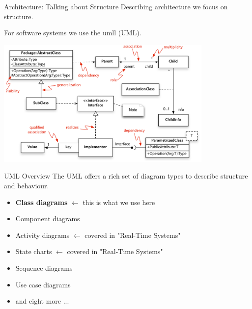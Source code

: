 \begin{frame}{Architecture: Talking about Structure}
   Describing architecture we focus on \gls{structure}.

   For software systems we use the \gls{umll} (\gls{UML}).

\begin{center}
  \includegraphics[height=180pt]{umlclasscheat.png}
\end{center}
  
\end{frame}

\begin{frame}{UML Overview}
The UML offers a rich set of diagram types to describe structure and behaviour.
    \begin{itemize}
       \item \textbf{\color{blue}Class diagrams} {\color{red}$\leftarrow$ this is what we use here}
      \item Component diagrams
       \item Activity diagrams {\color{red}$\leftarrow$ covered in "Real-Time Systems"}
       \item State charts  {\color{red}$\leftarrow$ covered in "Real-Time Systems"}
        \item Sequence diagrams
        \item Use case diagrams
         \item and eight more ...
   \end{itemize}
\end{frame}


